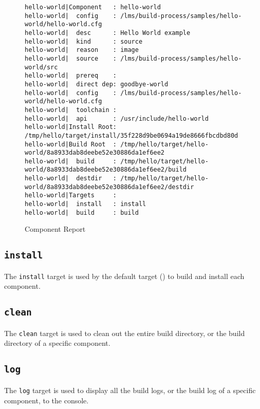 \begin{landscape}
\begin{figure}
\hrulefill
\begin{small}
\begin{verbatim}
hello-world|Component   : hello-world
hello-world|  config    : /lms/build-process/samples/hello-world/hello-world.cfg
hello-world|  desc      : Hello World example
hello-world|  kind      : source
hello-world|  reason    : image
hello-world|  source    : /lms/build-process/samples/hello-world/src
hello-world|  prereq    :
hello-world|  direct dep: goodbye-world
hello-world|  config    : /lms/build-process/samples/hello-world/hello-world.cfg
hello-world|  toolchain :
hello-world|  api       : /usr/include/hello-world
hello-world|Install Root: /tmp/hello/target/install/35f228d9be0694a19de8666fbcdbd80d
hello-world|Build Root  : /tmp/hello/target/hello-world/8a8933dab8deebe52e30886da1ef6ee2
hello-world|  build     : /tmp/hello/target/hello-world/8a8933dab8deebe52e30886da1ef6ee2/build
hello-world|  destdir   : /tmp/hello/target/hello-world/8a8933dab8deebe52e30886da1ef6ee2/destdir
hello-world|Targets     :
hello-world|  install   : install
hello-world|  build     : build
\end{verbatim}
\end{small}
\hrulefill
\caption{Component Report}\label{usinglmsbw:component-report}
\end{figure}
\end{landscape}

\subsection{\texttt{install}}

The \texttt{install} target is used by the default target
() to build and install each component.

\subsection{\texttt{clean}}

The \texttt{clean} target is used to clean out the entire build
directory, or the build directory of a specific component.

\subsection{\texttt{log}}
\label{using:component-log-target}

The \texttt{log} target is used to display all the build logs, or the
build log of a specific component, to the console.

